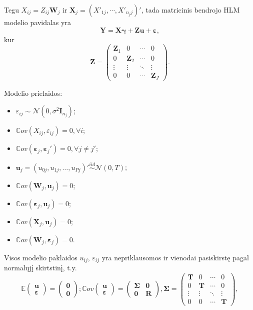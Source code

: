 \documentclass[12pt,a4paper]{article}
\begin{document}
Tegu $X_{ij}=Z_{ij}\mathbf{W}_j$ ir $\mathbf{X}_j = (X'_{1j}, \cdots, X'_{n_jj})'$, tada matricinis bendrojo HLM modelio pavidalas yra
\begin{equation} \label{eq:bendrasHLM}
\mathbf{Y}=\mathbf{X}\boldsymbol{\gamma}+\mathbf{Z}\mathbf{u}+\boldsymbol{\varepsilon},
\end{equation}
kur
\[
\mathbf{Z}=
\begin{pmatrix}
\mathbf{Z}_1 & 0 & \cdots & 0 \\
0 & \mathbf{Z}_2 & \cdots & 0\\
\vdots & \vdots & \ddots & \vdots \\
0&0 & \cdots & \mathbf{Z}_J
\end{pmatrix}.
\]

\noindent Modelio prielaidos:
\begin{itemize}
\item $\varepsilon_{ij} \sim \mathcal{N}(0, \sigma^2\mathbf{I}_{n_j})$;
\item $\mathbb{C}ov(X_{ij},\varepsilon_{ij})=0, \forall i$;
\item $\mathbb{C}ov(\boldsymbol{\varepsilon}_j,\boldsymbol{\varepsilon}_j')=0, \forall j\neq j'$;
\item $\mathbf{u}_j = (u_{0j}, u_{1j}, \dots, u_{Pj})' \overset{iid}{\sim} \mathcal{N}(0,T)$;
\item $\mathbb{C}ov(\mathbf{W}_{j}, \mathbf{u}_j)=0$;
\item $\mathbb{C}ov(\boldsymbol{\varepsilon}_j, \mathbf{u}_j)=0$;
\item $\mathbb{C}ov(\mathbf{X}_j, \mathbf{u}_j)=0$;
\item $\mathbb{C}ov(\mathbf{W}_j, \boldsymbol{\varepsilon}_j)=0$.
\end{itemize}
Visos modelio paklaidos $u_{ij}$, $\varepsilon_{ij}$ yra nepriklausomos ir vienodai pasiskirstę pagal normalųjį skirtstinį, t.y.
\[\mathbb{E}\begin{pmatrix}
\mathbf{u} \\
\boldsymbol{\varepsilon}
\end{pmatrix}=
\begin{pmatrix}
\mathbf{0} \\
\mathbf{0}
\end{pmatrix};
\mathbb{C}ov\begin{pmatrix}
\mathbf{u} \\
\boldsymbol{\varepsilon}
\end{pmatrix}=
\begin{pmatrix}
\mathbf{\Sigma}&\mathbf{0} \\
\mathbf{0}&\mathbf{R}
\end{pmatrix},
\mathbf{\Sigma}=
\begin{pmatrix}
\mathbf{T} & 0 & \cdots & 0 \\
0 & \mathbf{T} & \cdots & 0\\
\vdots & \vdots & \ddots & \vdots \\
0&0 & \cdots & \mathbf{T}
\end{pmatrix},
\]
\end{document}
